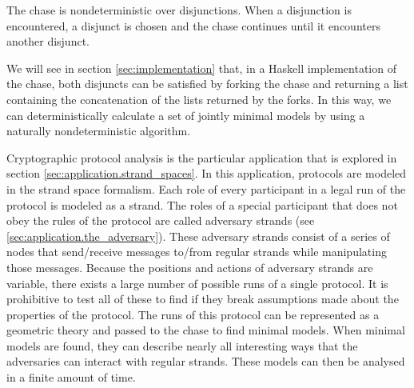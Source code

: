 		The chase is nondeterministic over disjunctions. When a disjunction is
		encountered, a disjunct is chosen and the chase continues until it
		encounters another disjunct.

		We will see in section \ref{sec:implementation} that, in a Haskell
		implementation of the chase, both disjuncts can be satisfied by forking
		the chase and returning a list containing the concatenation of the
		lists returned by the forks. In this way, we can deterministically
		calculate a set of jointly minimal models by using a naturally
		nondeterministic algorithm.

		Cryptographic protocol analysis is the particular application that is
		explored in section \ref{sec:application.strand_spaces}. In this
		application, protocols are modeled in the strand space formalism. Each
		role of every participant in a legal run of the protocol is modeled as
		a strand. The roles of a special participant that does not obey the
		rules of the protocol are called adversary strands (see
		\ref{sec:application.the_adversary}). These adversary strands consist
		of a series of nodes that send/receive messages to/from regular strands
		while manipulating those messages. Because the positions and actions of
		adversary strands are variable, there exists a large number of possible
		runs of a single protocol. It is prohibitive to test all of these to
		find if they break assumptions made about the properties of the
		protocol. The runs of this protocol can be represented as a geometric
		theory and passed to the chase to find minimal models. When minimal
		models are found, they can describe nearly all interesting ways that
		the adversaries can interact with regular strands. These models can
		then be analysed in a finite amount of time.
